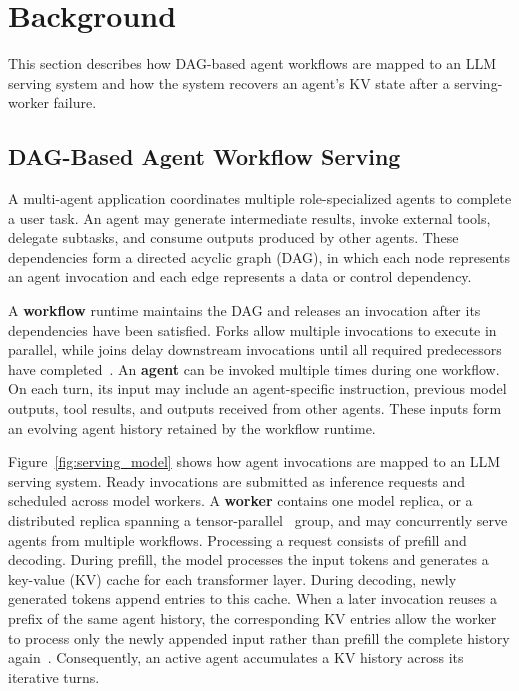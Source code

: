 \section{Background} \label{sec:background} 

This section describes how DAG-based agent workflows are mapped to an LLM serving system and how the system recovers an agent's KV state after a serving-worker failure.

\subsection{DAG-Based Agent Workflow Serving} \label{sec:background:serving} 

A multi-agent application coordinates multiple role-specialized agents to complete a user task. An agent may generate intermediate results, invoke external tools, delegate subtasks, and consume outputs produced by other agents. These dependencies form a directed acyclic graph (DAG), in which each node represents an agent invocation and each edge represents a data or control dependency. 

A \textbf{workflow} runtime maintains the DAG and releases an invocation after its dependencies have been satisfied. Forks allow multiple invocations to execute in parallel, while joins delay downstream invocations until all required predecessors have completed~\cite{lin2024parrot}. 
%
An \textbf{agent} can be invoked multiple times during one workflow. On each {turn}, its input may include an agent-specific instruction, previous model outputs, tool results, and outputs received from other agents. These inputs form an evolving agent history retained by the workflow runtime. 

Figure~\ref{fig:serving_model} shows how agent invocations are mapped to an LLM serving system. Ready invocations are submitted as inference requests and scheduled across model workers. A \textbf{worker} contains one model replica, or a distributed replica spanning a tensor-parallel~\cite{shoeybi2019megatron} group, and may concurrently serve agents from multiple workflows. 
%
Processing a request consists of prefill and decoding. During prefill, the model processes the input tokens and generates a key-value (KV) cache for each transformer layer. During decoding, newly generated tokens append entries to this cache. When a later invocation reuses a prefix of the same agent history, the corresponding KV entries allow the worker to process only the newly appended input rather than prefill the complete history again~\cite{gao2024cachedattention,zheng2024sglang}. Consequently, an active agent accumulates a KV history across its iterative turns. 

